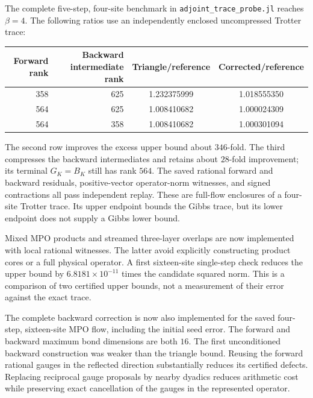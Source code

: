 \documentclass[11pt]{article}
\begin{document}
The complete five-step, four-site benchmark in
\texttt{adjoint\_trace\_probe.jl} reaches $\beta=4$. The following
ratios use an independently enclosed uncompressed Trotter trace:
\begin{center}
\begin{tabular}{rrcc}
Forward rank & Backward intermediate rank & Triangle/reference & Corrected/reference\\
\hline
358 & 625 & 1.232375999 & 1.018555350\\
564 & 625 & 1.008410682 & 1.000024309\\
564 & 358 & 1.008410682 & 1.000301094
\end{tabular}
\end{center}
The second row improves the excess upper bound about $346$-fold.
The third compresses the backward intermediates and retains about
$28$-fold improvement; its terminal $G_K=B_K$ still has rank $564$.
The saved rational forward and backward residuals, positive-vector
operator-norm witnesses, and signed contractions all pass independent
replay. These are full-flow enclosures of a four-site Trotter trace.
Its upper endpoint bounds the Gibbs trace, but its lower endpoint
does not supply a Gibbs lower bound.

Mixed MPO products and streamed three-layer overlaps are now implemented
with local rational witnesses. The latter avoid explicitly constructing
product cores or a full physical operator. A first sixteen-site
single-step check reduces the upper bound by $6.8181\times10^{-11}$
times the candidate squared norm. This is a comparison of two certified
upper bounds, not a measurement of their error against the exact trace.

The complete backward correction is now also implemented for the saved
four-step, sixteen-site MPO flow, including the initial seed error.
The forward and backward maximum bond dimensions are both $16$.
The first unconditioned backward construction was weaker than the triangle
bound. Reusing the forward rational gauges in the reflected direction
substantially reduces its certified defects. Replacing reciprocal gauge
proposals by nearby dyadics reduces arithmetic cost while preserving
exact cancellation of the gauges in the represented operator.
\end{document}
